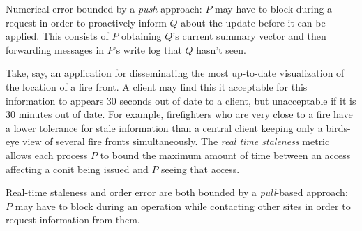 \documentclass[]             %
{NASA}                       %
\theoremstyle{definition}
\begin{document}
Numerical error bounded by a \emph{push}-approach:
$P$ may have to block during a request in order to proactively inform
$Q$ about the update before it can be applied. This consists of $P$
obtaining $Q$'s current summary vector and then forwarding messages in
$P$'s write log that $Q$ hasn't seen.

Take, say, an application for disseminating the most up-to-date
visualization of the location of a fire front. A client may find this
it acceptable for this information to appears 30 seconds out of date
to a client, but unacceptable if it is 30 minutes out of date. For
example, firefighters who are very close to a fire have a lower
tolerance for stale information than a central client keeping only a
birds-eye view of several fire fronts simultaneously. The \emph{real
  time staleness} metric allows each process $P$ to bound the maximum
amount of time between an access affecting a conit being issued and
$P$ seeing that access.

Real-time staleness and order error are both bounded by a
\emph{pull}-based approach: $P$ may have to block during an operation
while contacting other sites in order to request information from
them.

\end{document}

